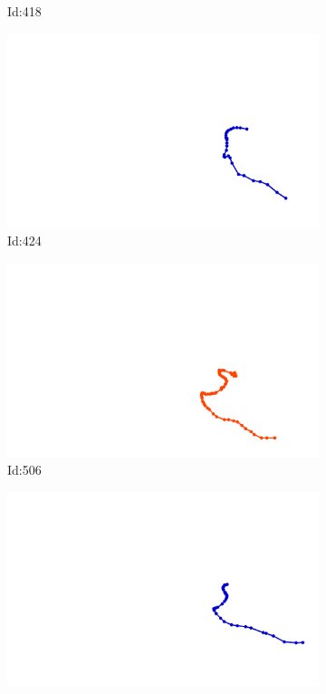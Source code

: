 \documentclass[12pt,twoside]{report}
\begin{document}
\begin{figure}
\begin{subfigure}[b]{0.20\textwidth}
\caption{Id:418}
\end{subfigure}
\begin{subfigure}[b]{0.20\textwidth}
\centering
\includegraphics[width=\textwidth]{../trajectories/424.png}
\caption{Id:424}
\end{subfigure}
\begin{subfigure}[b]{0.20\textwidth}
\centering
\includegraphics[width=\textwidth]{../trajectories/506.png}
\caption{Id:506}
\end{subfigure}
\begin{subfigure}[b]{0.20\textwidth}
\centering
\includegraphics[width=\textwidth]{../trajectories/574.png}

\end{subfigure}
\end{figure}
\end{document}
